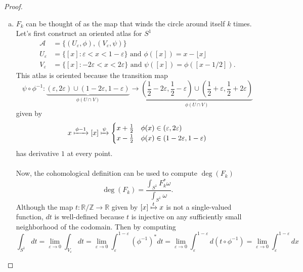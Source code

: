 \documentclass{article}
\begin{document}
\begin{proof} \text{} \\
  \begin{enumerate}[(a)]
    \item $F_k$ can be thought of as the map that winds the circle around
      itself $k$ times.
      Let's first construct an oriented atlas for $S^1$ \begin{align*}
        \mathcal{A} &= \{(U_\varepsilon, \phi), (V_\varepsilon, \psi)\}\\
        U_\varepsilon &= \{ [x] : \varepsilon < x < 1 - \varepsilon \} \text{ and } \phi([x]) = x - \lfloor x \rfloor \\
        V_\varepsilon &= \{ [x] : -2\varepsilon < x < 2\varepsilon \} \text{ and } \psi([x]) = \phi([x - 1/2]).
      \end{align*}
      This atlas is oriented because the transition map \[
        \psi \circ \phi^{-1}\colon
          \underbrace{(\varepsilon, 2\varepsilon) \cup (1-2\varepsilon, 1 - \varepsilon)}_{\phi(U \cap V)}
          \rightarrow
          \underbrace{\left(\frac{1}{2}-2\varepsilon, \frac{1}{2} - \varepsilon\right) \cup \left(\frac{1}{2} + \varepsilon, \frac{1}{2} + 2\varepsilon\right)}_{\phi(U \cap V)}
      \] given by \[
        x \xmapsto{\phi{-1}} [x] \xmapsto{\psi} \begin{cases}
          x + \frac{1}{2} & \phi(x) \in (\varepsilon, 2\varepsilon)\\
          x - \frac{1}{2} & \phi(x) \in (1 - 2\varepsilon, 1 - \varepsilon)
        \end{cases}
      \] has derivative $1$ at every point.
      \\~\\
      Now, the cohomological definition can be used to compute $\deg(F_k)$ \[
        \deg(F_k) = \frac{\displaystyle\int_{S^1} F_k^*\omega}{\displaystyle\int_{S^1} \omega}.
      \] Although the map
      $t\colon \mathbb{R}/\mathbb{Z} \rightarrow \mathbb{R}$
      given by $[x] \xmapsto{t} x$ is not a single-valued function, $dt$ is
      well-defined because $t$ is injective on any sufficiently small
      neighborhood of the codomain.
      Then by computing \[
        \int_{S^1}dt
          = \lim_{\varepsilon \rightarrow 0} \int_{V_\varepsilon}dt
          = \lim_{\varepsilon \rightarrow 0} \int_\varepsilon^{1 - \varepsilon} (\phi^{-1})^*dt
          = \lim_{\varepsilon \rightarrow 0} \int_\varepsilon^{1 - \varepsilon} d(t \circ \phi^{-1})
          = \lim_{\varepsilon \rightarrow 0} \int_\varepsilon^{1 - \varepsilon} dx
\]
\end{enumerate}
\end{proof}
\end{document}
